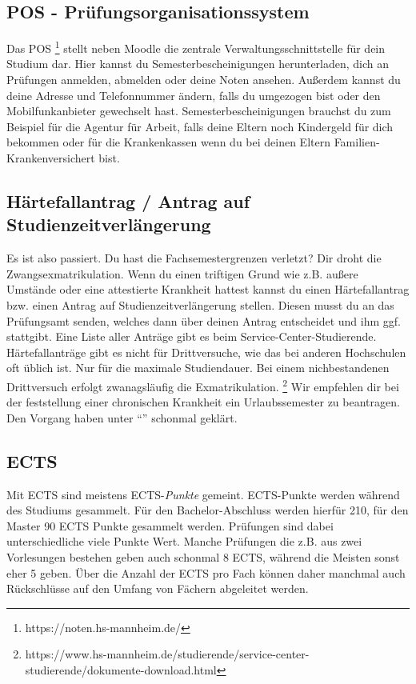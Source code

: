 \subsection*{POS - Prüfungsorganisationssystem}
Das POS \footnote{https://noten.hs-mannheim.de/} stellt neben Moodle die zentrale Verwaltungsschnittstelle für dein Studium dar.
Hier kannst du Semesterbescheinigungen herunterladen, dich an Prüfungen anmelden, abmelden oder deine Noten ansehen.
Außerdem kannst du deine Adresse und Telefonnummer ändern, falls du umgezogen bist oder den Mobilfunkanbieter gewechselt hast.
Semesterbescheinigungen brauchst du zum Beispiel für die Agentur für Arbeit, falls deine Eltern noch Kindergeld für dich bekommen oder für die Krankenkassen wenn du bei deinen Eltern Familien-Krankenversichert bist.

\subsection*{Härtefallantrag / Antrag auf Studienzeitverlängerung}
Es ist also passiert. 
Du hast die Fachsemestergrenzen verletzt? Dir droht die Zwangsexmatrikulation.
Wenn du einen triftigen Grund wie z.B. außere Umstände oder  eine attestierte Krankheit hattest kannst du einen Härtefallantrag bzw. einen Antrag auf Studienzeitverlängerung stellen.
Diesen musst du an das Prüfungsamt senden, welches dann über deinen Antrag entscheidet und ihm ggf. stattgibt.
Eine Liste aller Anträge gibt es beim Service-Center-Studierende.
Härtefallanträge gibt es nicht für Drittversuche, wie das bei anderen Hochschulen oft üblich ist.
Nur für die maximale Studiendauer.
Bei einem nichbestandenen Drittversuch erfolgt zwanagsläufig die Exmatrikulation.
\footnote{https://www.hs-mannheim.de/studierende/service-center-studierende/dokumente-download.html}
Wir empfehlen dir bei der feststellung einer chronischen Krankheit ein Urlaubssemester zu beantragen. 
Den Vorgang haben unter ``\hyperref[pruef:urlaub]{}'' schonmal geklärt.

\subsection*{ECTS}
Mit ECTS sind meistens ECTS-\textit{Punkte} gemeint.
ECTS-Punkte werden während des Studiums gesammelt.
Für den Bachelor-Abschluss werden hierfür 210, für den Master 90 ECTS Punkte gesammelt werden.
Prüfungen sind dabei unterschiedliche viele Punkte Wert.
Manche Prüfungen die z.B. aus zwei Vorlesungen bestehen geben auch schonmal 8 ECTS, während die Meisten sonst eher 5 geben.
Über die Anzahl der ECTS pro Fach können daher manchmal auch Rückschlüsse auf den Umfang von Fächern abgeleitet werden.

